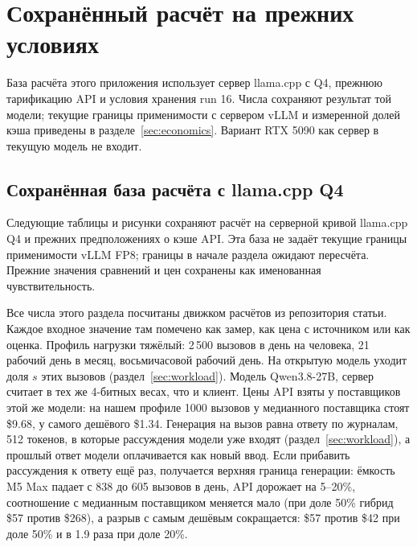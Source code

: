 \section{Сохранённый расчёт на прежних условиях}
\label{app:calculation-history}

База расчёта этого приложения использует сервер llama.cpp с Q4, прежнюю тарификацию API и условия хранения run 16.
Числа сохраняют результат той модели; текущие границы применимости с сервером vLLM и измеренной долей кэша приведены в разделе~\ref{sec:economics}.
Вариант RTX 5090 как сервер в текущую модель не входит.

\subsection{Сохранённая база расчёта с llama.cpp Q4}
\label{sec:economics-legacy}

Следующие таблицы и рисунки сохраняют расчёт на серверной кривой llama.cpp Q4 и прежних предположениях о кэше API.
Эта база не задаёт текущие границы применимости vLLM FP8; границы в начале раздела ожидают пересчёта.
Прежние значения сравнений и цен сохранены как именованная чувствительность.

Все числа этого раздела посчитаны движком расчётов из репозитория статьи. Каждое входное значение там помечено как
замер, как цена с источником или как оценка. Профиль нагрузки тяжёлый: 2\,500 вызовов в день на человека, 21 рабочий
день в месяц, восьмичасовой рабочий день. На открытую модель уходит доля $s$ этих вызовов (раздел~\ref{sec:workload}).
Модель Qwen3.8-27B, сервер считает в тех же 4-битных весах, что и клиент. Цены API взяты у поставщиков этой же модели: на нашем профиле
1000 вызовов у медианного поставщика стоят \$9.68, у самого дешёвого \$1.34. Генерация на вызов равна ответу по
журналам, 512 токенов, в которые рассуждения модели уже входят (раздел~\ref{sec:workload}), а прошлый ответ модели
оплачивается как новый ввод. Если прибавить рассуждения к ответу ещё раз, получается верхняя граница генерации:
ёмкость M5 Max падает с 838 до 605 вызовов в день, API дорожает на 5--20\%, соотношение с медианным поставщиком
меняется мало (при доле 50\% гибрид \$57 против \$268), а разрыв с самым дешёвым сокращается: \$57 против \$42 при
доле 50\% и в 1.9 раза при доле 20\%.

